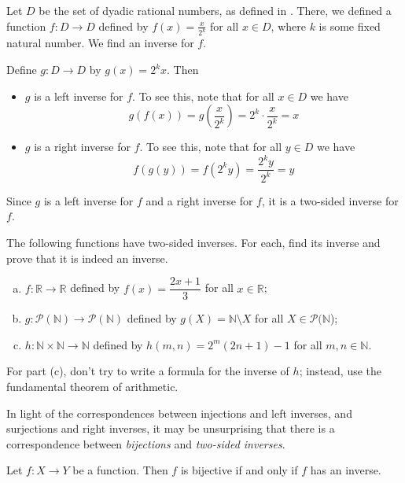 \begin{example}
Let $D$ be the set of dyadic rational numbers, as defined in . There, we defined a function $f : D \to D$ defined by $f(x)=\frac{x}{2^k}$ for all $x \in D$, where $k$ is some fixed natural number. We find an inverse for $f$.

Define $g : D \to D$ by $g(x) = 2^kx$. Then
\begin{itemize}
\item $g$ is a left inverse for $f$. To see this, note that for all $x \in D$ we have
\[ g(f(x)) = g(\frac{x}{2^k}) = 2^k \cdot \frac{x}{2^k} = x \]
\item $g$ is a right inverse for $f$. To see this, note that for all $y \in D$ we have
\[ f(g(y)) = f(2^ky) = \frac{2^ky}{2^k} = y \]
\end{itemize}
Since $g$ is a left inverse for $f$ and a right inverse for $f$, it is a two-sided inverse for $f$.
\end{example}

\begin{exercise}
\label{exFindTwoSidedInverses}
The following functions have two-sided inverses. For each, find its inverse and prove that it is indeed an inverse.
\begin{enumerate}[(a)]
\item $f : \mathbb{R} \to \mathbb{R}$ defined by $f(x)=\dfrac{2x+1}{3}$ for all $x \in \mathbb{R}$;
\item $g : \mathcal{P}(\mathbb{N}) \to \mathcal{P}(\mathbb{N})$ defined by $g(X) = \mathbb{N} \setminus X$ for all $X \in \mathcal{P}(\mathbb{N}$);
\item $h : \mathbb{N} \times \mathbb{N} \to \mathbb{N}$ defined by $h(m,n) = 2^m(2n+1)-1$ for all $m,n \in \mathbb{N}$.
\end{enumerate}
\begin{backhint}
For part (c), don't try to write a formula for the inverse of $h$; instead, use the fundamental theorem of arithmetic.
\end{backhint}
\end{exercise}

In light of the correspondences between injections and left inverses, and surjections and right inverses, it may be unsurprising that there is a correspondence between \textit{bijections} and \textit{two-sided inverses}.

\begin{exercise}
\label{exBijectiveIffHasInverse}
Let $f : X \to Y$ be a function. Then $f$ is bijective if and only if $f$ has an inverse.
\end{exercise}

